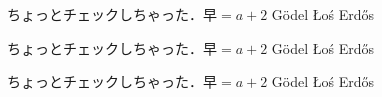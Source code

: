 \documentclass{ujarticle}
\begin{document}
ちょっとチェックしちゃった．$早=a+2$ Gödel Łoś Erdős

\disablecjkxfunc
ちょっとチェックしちゃった．$早=a+2$ Gödel Łoś Erdős

\forcecjkxfunc
ちょっとチェックしちゃった．$早=a+2$ Gödel Łoś Erdős
\end{document}
